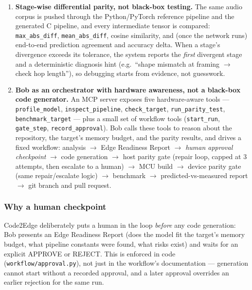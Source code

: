 \documentclass[11pt,a4paper]{article}
\begin{document}
\begin{enumerate}[leftmargin=1.4em]
  \item \textbf{Stage-wise differential parity, not black-box testing.} The
  same audio corpus is pushed through the Python/PyTorch reference
  pipeline and the generated C pipeline, and every intermediate tensor is
  compared: \texttt{max\_abs\_diff}, \texttt{mean\_abs\_diff}, cosine
  similarity, and (once the network runs) end-to-end prediction agreement
  and accuracy delta. When a stage's divergence exceeds its tolerance, the
  system reports the \emph{first} divergent stage and a deterministic
  diagnosis hint (e.g.\ ``shape mismatch at framing $\rightarrow$
  check hop length''), so debugging starts from evidence, not guesswork.
  \item \textbf{Bob as an orchestrator with hardware awareness, not a
  black-box code generator.} An MCP server exposes five hardware-aware
  tools --- \texttt{profile\_model}, \texttt{inspect\_pipeline},
  \texttt{check\_target}, \texttt{run\_parity\_test},
  \texttt{benchmark\_target} --- plus a small set of workflow tools
  (\texttt{start\_run}, \texttt{gate\_step}, \texttt{record\_approval}).
  Bob calls these tools to reason about the repository, the target's
  memory budget, and the parity results, and drives a fixed workflow:
  analysis $\rightarrow$ Edge Readiness Report $\rightarrow$ \emph{human
  approval checkpoint} $\rightarrow$ code generation $\rightarrow$ host
  parity gate (repair loop, capped at 3 attempts, then escalate to a
  human) $\rightarrow$ MCU build $\rightarrow$ device parity gate (same
  repair/escalate logic) $\rightarrow$ benchmark $\rightarrow$
  predicted-vs-measured report $\rightarrow$ git branch and pull request.
\end{enumerate}

\subsubsection{Why a human checkpoint}
Code2Edge deliberately puts a human in the loop \emph{before} any code
generation: Bob presents an Edge Readiness Report (does the model fit the
target's memory budget, what pipeline constants were found, what risks
exist) and waits for an explicit APPROVE or REJECT. This is enforced in
code (\texttt{workflow/approval.py}), not just in the workflow's
documentation --- generation cannot start without a recorded approval, and
a later approval overrides an earlier rejection for the same run.
\end{document}
